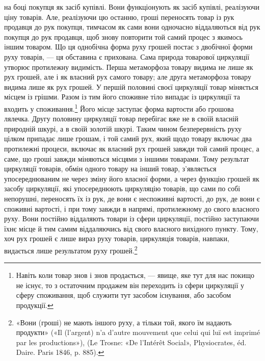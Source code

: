 \parcont{}  %
на боці покупця як засіб купівлі. Вони функціонують як засіб
купівлі, реалізуючи ціну товарів. Але, реалізуючи цю останню,
гроші переносять товар із рук продавця до рук покупця, тимчасом
як сами вони одночасно віддаляються від рук покупця до
рук продавця, щоб знову повторити той самий процес з якимось
іншим товаром. Що ця однобічна форма руху грошей постає з
двобічної форми руху товарів, — ця обставина є прихована. Сама
природа товарової циркуляції утворює протилежну видимість.
Перша метаморфоза товару видима не лише як рух грошей, але
і як власний рух самого товару; але друга метаморфоза товару
видима лише як рух грошей. У першій половині своєї циркуляції
товар міняється місцем із грішми. Разом із тим його споживне
тіло випадає із циркуляції та входить у споживання.\footnote{
Навіть коли товар знов і знов продається, — явище, яке тут для нас
покищо не існує, то з остаточним продажем він переходить із сфери циркуляції
у сферу споживання, щоб служити тут засобом існування, або
засобом продукції.
} Його
місце заступає форма вартости або грошова лялечка. Другу
половину циркуляції товар перебігає вже не в своїй власній
природній шкурі, а в своїй золотій шкурі. Таким чином безперервність
руху цілком припадає лише грошам, і той самий рух,
який щодо товару включає два протилежні процеси, включає як
власний рух грошей завжди той самий процес, а саме, що гроші
завжди міняються місцями з іншими товарами. Тому результат
циркуляції товарів, обмін одного товару на інший товар, з’являється
упосереднюваним не через зміну його власної форми, а
через функцію грошей як засобу циркуляції, які упосереднюють
циркуляцію товарів, що сами по собі непорушні, переносять їх
із рук, де вони є неспоживні вартості, до рук, де вони є споживні
вартості, і при тому завжди в напрямі, протилежному до свого
власного руху. Вони постійно віддаляють товари із сфери циркуляції,
постійно заступаючи їхнє місце й тим самим віддаляючись
від свого власного вихідного пункту. Тому, хоч рух грошей є
лише вираз руху товарів, циркуляція товарів, навпаки, видається
лише результатом руху грошей.\footnote{
«Вони (гроші) не мають іншого руху, а тільки той, якого їм надають
продукти» («Il (l’argent) n’a d’autre mouvement que celui qui luï
est imprimé par les productions»), (Le Trosne: «De l’Intérêt Social»,
Physiocrates, éd. Daire. Paris 1846, p. 885).
}

